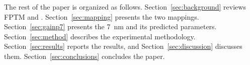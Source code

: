 The rest of the paper is organized as follows.
Section~\ref{sec:background} reviews FPTM and \gainp{}.
Section~\ref{sec:mapping} presents the two mappings.
Section~\ref{sec:gainp7} presents the 7~nm \gainp{} and its predicted parameters.
Section~\ref{sec:method} describes the experimental methodology.
Section~\ref{sec:results} reports the results, and Section~\ref{sec:discussion} discusses them.
Section~\ref{sec:conclusions} concludes the paper.

